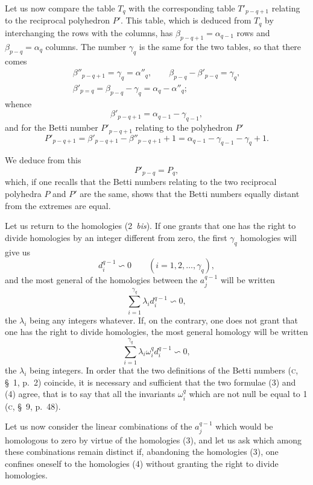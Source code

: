 \documentclass{article}
\begin{document}
Let us now compare the table $T_{q}$ with the corresponding table $T'_{p-q+1}$ relating to the reciprocal polyhedron $P'$. This table, which is deduced from $T_{q}$ by interchanging the rows with the columns, has $\beta_{p-q+1} = \alpha_{q-1}$ rows and $\beta_{p-q} = \alpha_{q}$ columns. The number $\gamma_{q}$ is the same for the two tables, so that there comes
\[ \begin{gathered} \beta''_{p-q+1} = \gamma_{q} = \alpha''_{q}, \qquad \beta_{p-q} - \beta'_{p-q} = \gamma_{q}, \\ \beta'_{p=q} = \beta_{p-q} - \gamma_{q} = \alpha_{q} - \alpha''_{q}; \end{gathered} \]
whence
\[ \beta'_{p-q+1} = \alpha_{q-1} - \gamma_{q-1}, \]
and for the Betti number $P'_{p-q+1}$ relating to the polyhedron $P'$
\[ P'_{p-q+1} = \beta'_{p-q+1} - \beta''_{p-q+1} + 1 = \alpha_{q-1} - \gamma_{q-1} - \gamma_{q} + 1. \]

We deduce from this
\[ P'_{p-q} = P_{q}, \]
which, if one recalls that the Betti numbers relating to the two reciprocal polyhedra $P$ and $P'$ are the same, shows that the Betti numbers equally distant from the extremes are equal.

Let us return to the homologies (2~\emph{bis}). If one grants that one has the right to divide homologies by an integer different from zero, the first $\gamma_{q}$ homologies will give us
\[ d^{q-1}_{i} \backsim 0 \qquad (i = 1, 2, \ldots, \gamma_{q}), \]
and the most general of the homologies between the $a^{q-1}_{j}$ will be written
\[ \sum_{i=1}^{\gamma_{q}} \lambda_{i} d^{q-1}_{i} \backsim 0, \tag{3} \]
the $\lambda_{i}$ being any integers whatever. If, on the contrary, one does not grant that one has the right to divide homologies, the most general homology will be written
\[ \sum_{i=1}^{\gamma_{q}} \lambda_{i} \omega^{q}_{i} d^{q-1}_{i} \backsim 0, \tag{4} \]
the $\lambda_{i}$ being integers. In order that the two definitions of the Betti numbers (\textsc{c}, \S~1, p.\ 2) coincide, it is necessary and sufficient that the two formulae (3) and (4) agree, that is to say that all the invariants $\omega^{q}_{i}$ which are not null be equal to 1 (\textsc{c}, \S~9, p.\ 48).

Let us now consider the linear combinations of the $a^{q-1}_{j}$ which would be homologous to zero by virtue of the homologies (3), and let us ask which among these combinations remain distinct
if, abandoning the homologies (3), one confines oneself to the homologies (4) without granting the right to divide homologies.
\end{document}
